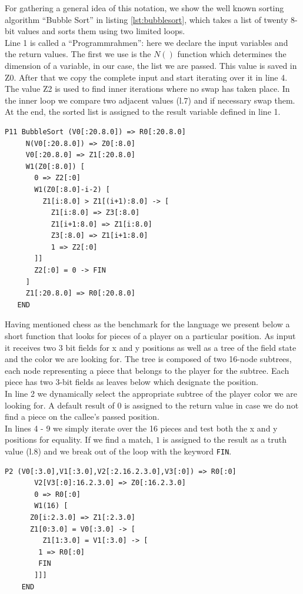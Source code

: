 \documentclass{llncs}
\begin{document}
 For gathering a general idea of this notation, we show the well known sorting algorithm 
 ``Bubble Sort'' in listing \ref{lst:bubblesort}, 
 which takes a list of twenty 8-bit values and sorts them using two limited loops. \\
 Line 1 is called a ``Programmrahmen'': here we declare the input variables and the return values. 
 The first we use is the $N()$ function which determines the dimension of a variable, in our case, 
 the list we are passed. This value is saved in Z0. After that we copy the complete input and 
 start iterating over it in line 4. The value Z2 is used to find inner iterations where no swap has taken place.
 In the inner loop we compare two adjacent values (l.7) and if necessary swap them.
 At the end, the sorted list is assigned to the result variable defined in line 1.

 \begin{lstlisting}[caption=Bubble Sort in Linearized Plan Calculus Notation,label={lst:bubblesort}]
   P11 BubbleSort (V0[:20.8.0]) => R0[:20.8.0]
     N(V0[:20.8.0]) => Z0[:8.0]
     V0[:20.8.0] => Z1[:20.8.0]
     W1(Z0[:8.0]) [
       0 => Z2[:0]
       W1(Z0[:8.0]-i-2) [
         Z1[i:8.0] > Z1[(i+1):8.0] -> [
           Z1[i:8.0] => Z3[:8.0]
           Z1[i+1:8.0] => Z1[i:8.0]
           Z3[:8.0] => Z1[i+1:8.0]
           1 => Z2[:0]
       ]]
       Z2[:0] = 0 -> FIN
     ]
     Z1[:20.8.0] => R0[:20.8.0]
   END
 \end{lstlisting}

 Having mentioned chess as the benchmark for the language we present below 
 a short function that looks for pieces of a player on a particular position.
 As input it receives two 3 bit fields for x and y positions as well as a tree
 of the field state and the color we are looking for.
 The tree is composed of two 16-node subtrees, each node representing a piece 
 that belongs to the player for the subtree. Each piece has two 3-bit fields 
 as leaves below which designate the position.\\
 In line 2 we dynamically select the appropriate subtree of the player color 
 we are looking for. A default result of $0$ is assigned to the return value 
 in case we do not find a piece on the callee's passed position.\\
 In lines 4 - 9 we simply iterate over the 16 pieces and test both the 
 x and y positions for equality. If we find a match, $1$ is assigned to the 
 result as a truth value (l.8) and we break out of the loop with the keyword {\tt FIN}.
 \begin{lstlisting}[caption=Selecting from a chess field,label={lst:chess}]
    P2 (V0[:3.0],V1[:3.0],V2[:2.16.2.3.0],V3[:0]) => R0[:0]
       V2[V3[:0]:16.2.3.0] => Z0[:16.2.3.0]
       0 => R0[:0]
       W1(16) [
	  Z0[i:2.3.0] => Z1[:2.3.0]
	  Z1[0:3.0] = V0[:3.0] -> [
	     Z1[1:3.0] = V1[:3.0] -> [
		1 => R0[:0]
		FIN
       ]]]
    END
 \end{lstlisting}
\end{document}
